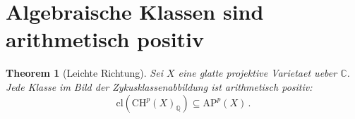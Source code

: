 \documentclass[aps,prd,twocolumn,superscriptaddress,nofootinbib]{revtex4-2}
\newtheorem{theorem}{Theorem}[section]
\theoremstyle{definition}
\theoremstyle{remark}
\begin{document}
\section{Algebraische Klassen sind arithmetisch positiv}
\label{sec:easy_direction}

\begin{theorem}[Leichte Richtung]
\label{thm:easy_direction}
Sei $X$ eine glatte projektive Varietaet ueber $\mathbb{C}$. Jede Klasse im Bild der Zykusklassenabbildung ist arithmetisch positiv:
\begin{equation}
\mathrm{cl}\!\left(\mathrm{CH}^p(X)_\mathbb{Q}\right) \subseteq \mathrm{AP}^p(X)\,.
\end{equation}
\end{theorem}
\end{document}
